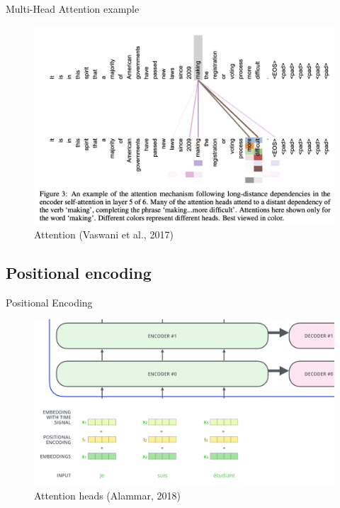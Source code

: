 \documentclass[10pt]{beamer}
\begin{document}
\begin{frame}{Multi-Head Attention example}

\begin{figure}[h]
\centering
\includegraphics[width=1\textwidth]{fig/Vaswani_3_attention.png}
\caption{Attention (Vaswani et al., 2017)}
\end{figure}

\end{frame}

\subsection{Positional encoding}

\begin{frame}{Positional Encoding}

\begin{figure}[h]
\centering
\includegraphics[width=1\textwidth]{fig/alammar_transformer_positional_encoding_vectors.png}
\caption{Attention heads (Alammar, 2018)}
\end{figure}

\end{frame}
\end{document}

